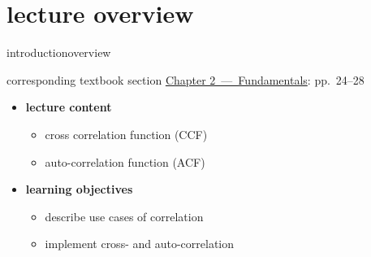 




\subtitle{Module 2.7: Fundamentals~---~Correlation}


	

    \section[overview]{lecture overview}
        \begin{frame}{introduction}{overview}
            \begin{block}{corresponding textbook section}
                    \href{http://ieeexplore.ieee.org/xpl/articleDetails.jsp?tp=&arnumber=6331119&}{Chapter 2~---~Fundamentals}: pp.~24--28
            \end{block}

            \begin{itemize}
                \item   \textbf{lecture content}
                    \begin{itemize}
                        \item   cross correlation function (CCF)
                        \item   auto-correlation function (ACF)
                    \end{itemize}
                \bigskip
                \item<2->   \textbf{learning objectives}
                    \begin{itemize}
                        \item   describe use cases of correlation
                        \item   implement cross- and auto-correlation
                    \end{itemize}
            \end{itemize}
        \end{frame}

